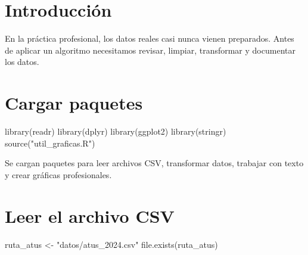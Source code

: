 \documentclass[
  spanish,
  11pt,
  letterpaper,
]{book}
\newenvironment{Shaded}{}{}
\newcommand{\FunctionTok}[1]{\textcolor[rgb]{0.44,0.26,0.76}{#1}}
\newcommand{\NormalTok}[1]{\textcolor[rgb]{0.14,0.16,0.18}{#1}}
\newcommand{\OtherTok}[1]{\textcolor[rgb]{0.44,0.26,0.76}{#1}}
\newcommand{\StringTok}[1]{\textcolor[rgb]{0.01,0.18,0.38}{#1}}
\begin{document}
\section{Introducción}\label{introducciuxf3n-1}

En la práctica profesional, los datos reales casi nunca vienen
preparados. Antes de aplicar un algoritmo necesitamos revisar, limpiar,
transformar y documentar los datos.

\section{Cargar paquetes}\label{cargar-paquetes}

\begin{Shaded}
\begin{Highlighting}[]
\FunctionTok{library}\NormalTok{(readr)}
\FunctionTok{library}\NormalTok{(dplyr)}
\FunctionTok{library}\NormalTok{(ggplot2)}
\FunctionTok{library}\NormalTok{(stringr)}
\FunctionTok{source}\NormalTok{(}\StringTok{"util\_graficas.R"}\NormalTok{)}
\end{Highlighting}
\end{Shaded}

\begin{tcolorbox}[enhanced jigsaw, arc=.35mm, bottomrule=.15mm, bottomtitle=1mm, breakable, colback=white, colbacktitle=quarto-callout-note-color!10!white, colframe=quarto-callout-note-color-frame, coltitle=black, left=2mm, leftrule=.75mm, opacityback=0, opacitybacktitle=0.6, rightrule=.15mm, title=\textcolor{quarto-callout-note-color}{\faInfo}\hspace{0.5em}{Explicación del código}, titlerule=0mm, toprule=.15mm, toptitle=1mm]

Se cargan paquetes para leer archivos CSV, transformar datos, trabajar
con texto y crear gráficas profesionales.

\end{tcolorbox}

\section{Leer el archivo CSV}\label{leer-el-archivo-csv}

\begin{Shaded}
\begin{Highlighting}[]
\NormalTok{ruta\_atus }\OtherTok{\textless{}{-}} \StringTok{"datos/atus\_2024.csv"}
\FunctionTok{file.exists}\NormalTok{(ruta\_atus)}
\end{Highlighting}
\end{Shaded}
\end{document}
